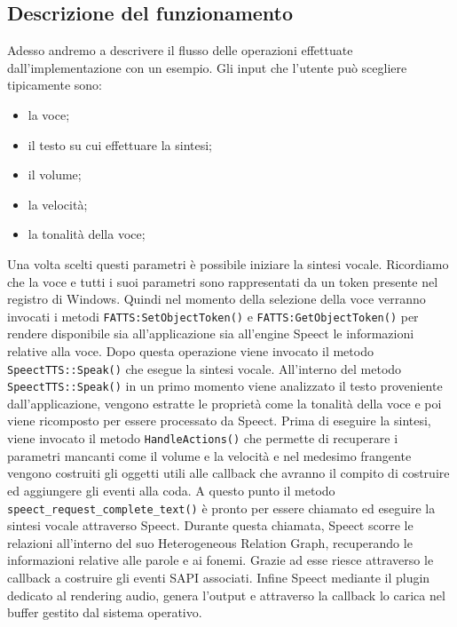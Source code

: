 \subsection{Descrizione del funzionamento}
Adesso andremo a descrivere il flusso delle operazioni effettuate dall'implementazione con un esempio.
Gli input che l'utente può scegliere tipicamente sono:
\begin{itemize}
	\item la voce;
	\item il testo su cui effettuare la sintesi;
	\item il volume;
	\item la velocità;
	\item la tonalità della voce;
\end{itemize}
Una volta scelti questi parametri è possibile iniziare la sintesi vocale. Ricordiamo che la voce e tutti i suoi parametri sono rappresentati da un token presente nel registro di Windows.
Quindi nel momento della selezione della voce verranno invocati i metodi \texttt{FATTS:SetObjectToken()} e \texttt{FATTS:GetObjectToken()} per rendere disponibile sia all'applicazione sia all'engine Speect le informazioni relative alla voce.
Dopo questa operazione viene invocato il metodo \texttt{SpeectTTS::Speak()} che esegue la sintesi vocale.
All'interno del metodo \texttt{SpeectTTS::Speak()} in un primo momento viene analizzato il testo proveniente dall'applicazione, vengono estratte le proprietà come la tonalità della voce e poi viene ricomposto per essere processato da Speect.
Prima di eseguire la sintesi, viene invocato il metodo \texttt{HandleActions()} che permette di recuperare i parametri mancanti come il volume e la velocità e nel medesimo frangente vengono costruiti gli oggetti utili alle callback che avranno il compito di costruire ed aggiungere gli eventi alla coda.
A questo punto il metodo \texttt{speect\_request\_complete\_text()} è pronto per essere chiamato ed eseguire la sintesi vocale attraverso Speect.
Durante questa chiamata, Speect scorre le relazioni all'interno del suo Heterogeneous Relation Graph, recuperando le informazioni relative alle parole e ai fonemi. Grazie ad esse riesce attraverso le callback a costruire gli eventi SAPI associati.
Infine Speect mediante il plugin dedicato al rendering audio, genera l'output e attraverso la callback lo carica nel buffer gestito dal sistema operativo.